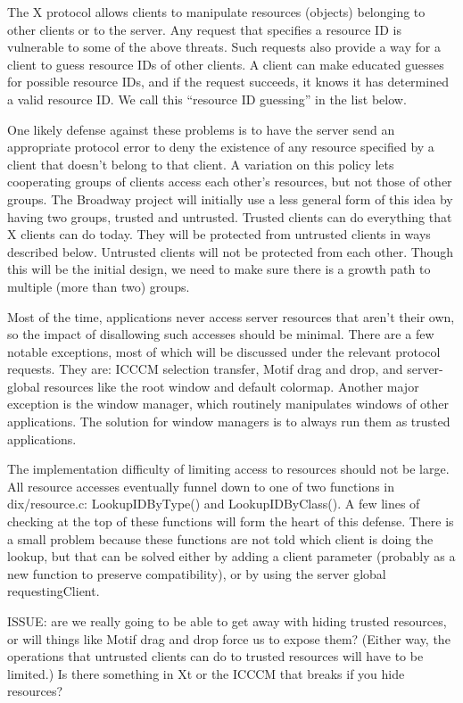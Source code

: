 \documentclass{article}
\begin{document}
The X protocol allows clients to manipulate resources (objects)
belonging to other clients or to the server.  Any request that
specifies a resource ID is vulnerable to some of the above threats.
Such requests also provide a way for a client to guess resource IDs of
other clients.  A client can make educated guesses for possible
resource IDs, and if the request succeeds, it knows it has determined
a valid resource ID.  We call this ``resource ID guessing'' in the
list below.

One likely defense against these problems is to have the server send
an appropriate protocol error to deny the existence of any resource
specified by a client that doesn't belong to that client.  A variation
on this policy lets cooperating groups of clients access each other's
resources, but not those of other groups.  The Broadway project will
initially use a less general form of this idea by having two groups,
trusted and untrusted.  Trusted clients can do everything that X
clients can do today.  They will be protected from untrusted clients
in ways described below.  Untrusted clients will not be protected from
each other.  Though this will be the initial design, we need to make
sure there is a growth path to multiple (more than two) groups.

Most of the time, applications never access server resources that
aren't their own, so the impact of disallowing such accesses should be
minimal.  There are a few notable exceptions, most of which will be
discussed under the relevant protocol requests.  They are: ICCCM
selection transfer, Motif drag and drop, and server-global resources
like the root window and default colormap.  Another major exception is
the window manager, which routinely manipulates windows of other
applications.  The solution for window managers is to always run them
as trusted applications.

The implementation difficulty of limiting access to resources should
not be large.  All resource accesses eventually funnel down to one of
two functions in dix/resource.c: LookupIDByType() and
LookupIDByClass().  A few lines of checking at the top of these
functions will form the heart of this defense.  There is a small
problem because these functions are not told which client is doing the
lookup, but that can be solved either by adding a client parameter
(probably as a new function to preserve compatibility), or by using
the server global requestingClient.

ISSUE: are we really going to be able to get away with hiding trusted
resources, or will things like Motif drag and drop force us to expose
them?  (Either way, the operations that untrusted clients can do to
trusted resources will have to be limited.)  Is there something in Xt
or the ICCCM that breaks if you hide resources?
\end{document}
